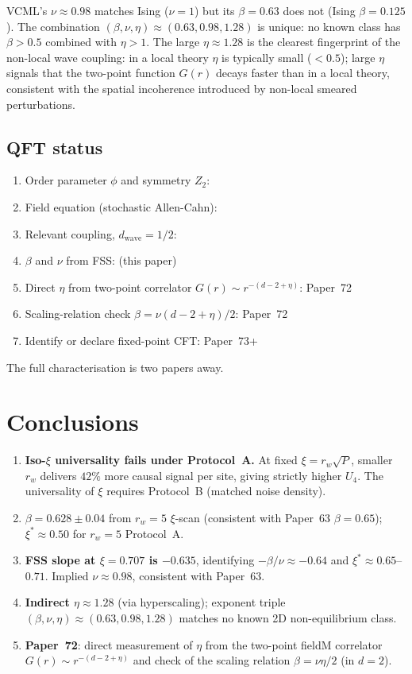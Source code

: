 \documentclass[twocolumn,10pt]{article}
\begin{document}
VCML's $\nu\approx0.98$ matches Ising ($\nu=1$) but its $\beta=0.63$ does not
(Ising $\beta=0.125$).
The combination $(\beta,\nu,\eta)\approx(0.63,0.98,1.28)$ is unique:
no known class has $\beta>0.5$ combined with $\eta>1$.
The large $\eta\approx1.28$ is the clearest fingerprint of the non-local
wave coupling: in a local theory $\eta$ is typically small ($<0.5$);
large $\eta$ signals that the two-point function $G(r)$ decays faster
than in a local theory, consistent with the spatial incoherence introduced
by non-local smeared perturbations.

\subsection{QFT status}

\begin{enumerate}
  \item Order parameter $\phi$ and symmetry $Z_2$: \checkmark
  \item Field equation (stochastic Allen-Cahn): \checkmark
  \item Relevant coupling, $d_\mathrm{wave}=1/2$: \checkmark
  \item $\beta$ and $\nu$ from FSS: \checkmark (this paper)
  \item Direct $\eta$ from two-point correlator $G(r)\sim r^{-(d-2+\eta)}$:
        Paper~72
  \item Scaling-relation check $\beta=\nu(d-2+\eta)/2$: Paper~72
  \item Identify or declare fixed-point CFT: Paper~73+
\end{enumerate}
The full characterisation is two papers away.

\section{Conclusions}

\begin{enumerate}
  \item \textbf{Iso-$\xi$ universality fails under Protocol~A.}
        At fixed $\xi=r_w\sqrt{P}$, smaller $r_w$ delivers $42\%$ more
        causal signal per site, giving strictly higher $U_4$.
        The universality of $\xi$ requires Protocol~B (matched noise density).
  \item \textbf{$\beta=0.628\pm0.04$} from $r_w=5$ $\xi$-scan (consistent with
        Paper~63 $\beta=0.65$); $\xi^*\approx0.50$ for $r_w=5$ Protocol~A.
  \item \textbf{FSS slope at $\xi=0.707$ is $-0.635$}, identifying
        $-\beta/\nu\approx-0.64$ and $\xi^*\approx0.65$--$0.71$.
        Implied $\nu\approx0.98$, consistent with Paper~63.
  \item \textbf{Indirect $\eta\approx1.28$} (via hyperscaling);
        exponent triple $(\beta,\nu,\eta)\approx(0.63,0.98,1.28)$ matches
        no known 2D non-equilibrium class.
  \item \textbf{Paper~72}: direct measurement of $\eta$ from the two-point
        fieldM correlator $G(r)\sim r^{-(d-2+\eta)}$ and check of the
        scaling relation $\beta=\nu\eta/2$ (in $d=2$).
\end{enumerate}
\end{document}
